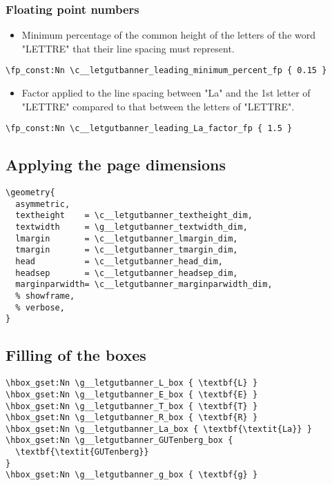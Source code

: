 \documentclass{letgut}
\begin{document}
\subsubsection{Floating point numbers}
\label{ImplementationDeclarationsFloatingpointnumbers-e75hxqt0fck0}
\begin{itemize}
\item Minimum percentage of the common height of the letters of the word "LETTRE"
that their line spacing must represent.
\end{itemize}
\begin{lstlisting}
\fp_const:Nn \c__letgutbanner_leading_minimum_percent_fp { 0.15 }
\end{lstlisting}
\begin{itemize}
\item Factor applied to the line spacing between "La" and the 1st letter of
"LETTRE" compared to that between the letters of "LETTRE".
\end{itemize}
\begin{lstlisting}
\fp_const:Nn \c__letgutbanner_leading_La_factor_fp { 1.5 }
\end{lstlisting}

\subsection{Applying the page dimensions}
\label{ImplementationApplyingthepagedimensions-187hxqt0fck0}
\begin{lstlisting}
\geometry{
  asymmetric,
  textheight    = \c__letgutbanner_textheight_dim,
  textwidth     = \g__letgutbanner_textwidth_dim,
  lmargin       = \c__letgutbanner_lmargin_dim,
  tmargin       = \c__letgutbanner_tmargin_dim,
  head          = \c__letgutbanner_head_dim,
  headsep       = \c__letgutbanner_headsep_dim,
  marginparwidth= \c__letgutbanner_marginparwidth_dim,
  % showframe,
  % verbose,
}
\end{lstlisting}

\subsection{Filling of the boxes}
\label{ImplementationFillingoftheboxes-q49hxqt0fck0}
\begin{lstlisting}
\hbox_gset:Nn \g__letgutbanner_L_box { \textbf{L} }
\hbox_gset:Nn \g__letgutbanner_E_box { \textbf{E} }
\hbox_gset:Nn \g__letgutbanner_T_box { \textbf{T} }
\hbox_gset:Nn \g__letgutbanner_R_box { \textbf{R} }
\hbox_gset:Nn \g__letgutbanner_La_box { \textbf{\textit{La}} }
\hbox_gset:Nn \g__letgutbanner_GUTenberg_box {
  \textbf{\textit{GUTenberg}}
}
\hbox_gset:Nn \g__letgutbanner_g_box { \textbf{g} }
\end{lstlisting}
\end{document}
